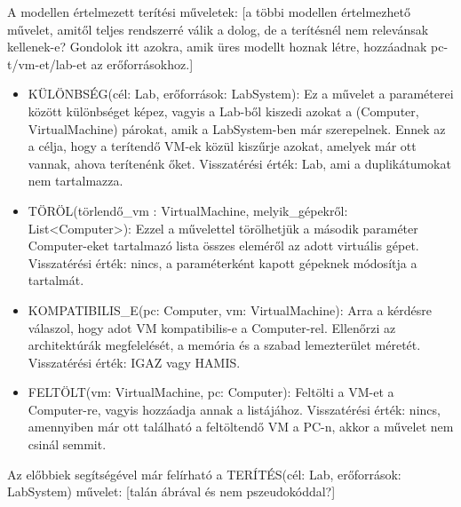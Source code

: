 A modellen értelmezett terítési műveletek: [a többi modellen értelmezhető művelet, amitől teljes rendszerré válik a dolog, de a terítésnél nem relevánsak kellenek-e? Gondolok itt azokra, amik üres modellt hoznak létre, hozzáadnak pc-t/vm-et/lab-et az erőforrásokhoz.]

\begin{itemize}
  \item KÜLÖNBSÉG(cél: Lab, erőforrások: LabSystem): Ez a művelet a paraméterei között különbséget képez, vagyis a Lab-ből kiszedi azokat a (Computer, VirtualMachine) párokat, amik a LabSystem-ben már szerepelnek. Ennek az a célja, hogy a terítendő VM-ek közül kiszűrje azokat, amelyek már ott vannak, ahova terítenénk őket. Visszatérési érték: Lab, ami a duplikátumokat nem tartalmazza.
  \item TÖRÖL(törlendő\_vm : VirtualMachine, melyik\_gépekről: List<Computer>): Ezzel a művelettel törölhetjük a második paraméter Computer-eket tartalmazó lista összes eleméről az adott virtuális gépet. Visszatérési érték: nincs, a paraméterként kapott gépeknek módosítja a tartalmát.
  \item KOMPATIBILIS\_E(pc: Computer, vm: VirtualMachine): Arra a kérdésre válaszol, hogy adot VM kompatibilis-e a Computer-rel. Ellenőrzi az architektúrák megfelelését, a memória és a szabad lemezterület méretét. Visszatérési érték: IGAZ vagy HAMIS.
  \item FELTÖLT(vm: VirtualMachine, pc: Computer): Feltölti a VM-et a Computer-re, vagyis hozzáadja annak a  listájához. Visszatérési érték: nincs, amennyiben már ott található a feltöltendő VM a PC-n, akkor a művelet nem csinál semmit.
\end{itemize}

Az előbbiek segítségével már felírható a TERÍTÉS(cél: Lab, erőforrások: LabSystem) művelet: [talán ábrával és nem pszeudokóddal?]

\\
\indent {}\\
\indent \indent {}\\
\indent \indent \indent	{}\\
\indent \indent \indent	{}\\
\indent \indent \indent \indent	{}


